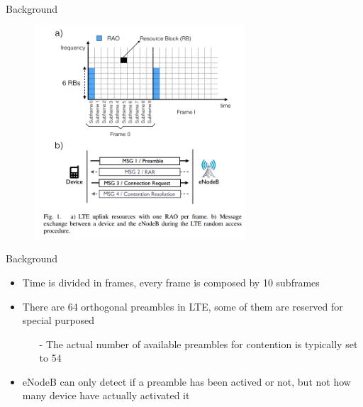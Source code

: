 \documentclass{beamer}
\begin{document}
\begin{frame}{Background}
    \begin{figure}[t]
        \centering
        \includegraphics[width=0.7\textwidth]{figures/ab.png}
    \end{figure}
\end{frame}
\begin{frame}{Background}
\begin{itemize}
    \item {Time is divided in frames, every frame is composed by 10 subframes}
    \item {There are 64 orthogonal preambles in LTE, some of them are reserved for special purposed}
    \begin{itemize}    
        \item[-]{The actual number of available preambles for contention is typically set to 54}
    \end{itemize}
    \item {eNodeB can only detect if a preamble has been actived or not, but not how many device have actually activated it}

\end{itemize}

\end{frame}
\end{document}
